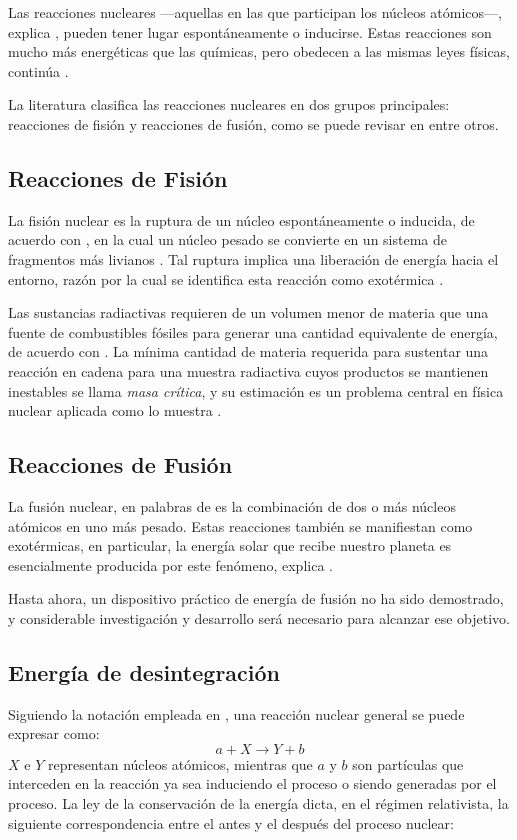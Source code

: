 Las reacciones nucleares —aquellas en las que participan los núcleos atómicos—, explica \cite{Murray.2020}, pueden tener lugar espontáneamente o inducirse. Estas reacciones son mucho más energéticas que las químicas, pero obedecen a las mismas leyes físicas, continúa \cite{Murray.2020}. 

La literatura clasifica las reacciones nucleares en dos grupos principales: reacciones de fisión y reacciones de fusión, como se puede revisar en \cite{Basdevant.2005, Cottingham.2001, Krane.1987, Murray.2020} entre otros.

\subsection{Reacciones de Fisión}
La fisión nuclear es la ruptura de un núcleo espontáneamente o inducida, de acuerdo con \cite{Basdevant.2005}, en la cual un núcleo pesado se convierte en un sistema de fragmentos más livianos \cite{Murray.2020}. Tal ruptura implica una liberación de energía hacia el entorno, razón por la cual se identifica esta reacción como exotérmica \cite{Basdevant.2005, Murray.2020}. 

Las sustancias radiactivas requieren de un volumen menor de materia que una fuente de combustibles fósiles para generar una cantidad equivalente de energía, de acuerdo con \cite{Sanctis.2016}. La mínima cantidad de materia requerida para sustentar una reacción en cadena para una muestra radiactiva cuyos productos se mantienen inestables se llama \textit{masa crítica}, y su estimación es un problema central en física nuclear aplicada como lo muestra \cite{MoralesBolio.1974}. 

\subsection{Reacciones de Fusión}
La fusión nuclear, en palabras de \cite{Murray.2020} es la combinación de dos o más núcleos atómicos en uno más pesado. Estas reacciones también se manifiestan como exotérmicas, en particular, la energía solar que recibe nuestro planeta es esencialmente producida por este fenómeno, explica \cite{Basdevant.2005}. 

Hasta ahora, un dispositivo práctico de energía de fusión no ha sido demostrado, y considerable investigación y desarrollo será necesario para alcanzar ese objetivo. \cite{Murray.2020}

\subsection{Energía de desintegración}
Siguiendo la notación empleada en \cite{Krane.1987}, una reacción nuclear general se puede expresar como:
\begin{equation*}
  a + X \longrightarrow Y + b  
\end{equation*}
$X$ e $Y$ representan núcleos atómicos, mientras que $a$ y $b$ son partículas que interceden en la reacción ya sea induciendo el proceso o siendo generadas por el proceso. La ley de la conservación de la energía dicta, en el régimen relativista, la siguiente correspondencia entre el antes y el después del proceso nuclear:

